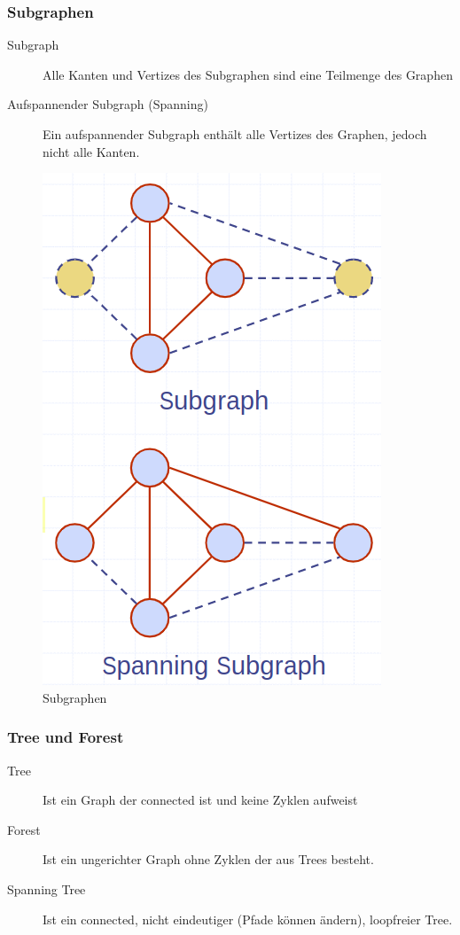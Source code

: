 \subsubsection{Subgraphen}
\begin{description}
	\item[Subgraph] Alle Kanten und Vertizes des Subgraphen sind eine Teilmenge des Graphen
	\item[Aufspannender Subgraph (Spanning)] Ein aufspannender Subgraph enthält alle Vertizes des Graphen, jedoch nicht alle Kanten.
\end{description}

\begin{figure}[ht!]
	\centering
	\begin{minipage}[t]{0.4\textwidth}
		\centering
		\includegraphics[width=0.4\linewidth]{images/subgraph}
		\caption{Subgraphen}
		\label{fig:graphpfad}
	\end{minipage}
\end{figure}

\subsubsection{Tree und Forest}
\begin{description}
	\item[Tree] Ist ein Graph der connected ist und keine Zyklen aufweist
	\item[Forest] Ist ein ungerichter Graph ohne Zyklen der aus Trees besteht.
	\item[Spanning Tree] Ist ein connected, nicht eindeutiger (Pfade können ändern), loopfreier Tree.
\end{description}

